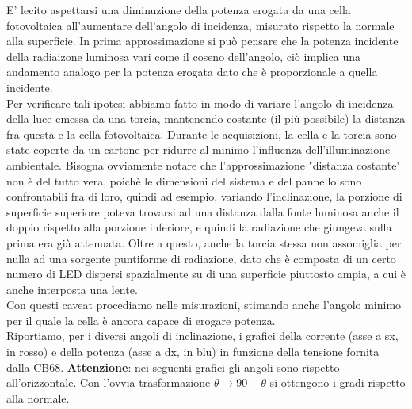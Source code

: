 \documentclass[journal, a4paper]{IEEEtran}
\begin{document}
E' lecito aspettarsi una diminuzione della potenza erogata da una cella fotovoltaica all'aumentare dell'angolo di incidenza, misurato rispetto la normale alla superficie. In prima approssimazione si può pensare che la potenza incidente della radiaizone luminosa vari come il coseno dell'angolo, ciò implica una andamento analogo per la potenza erogata dato che è proporzionale a quella incidente.\\
Per verificare tali ipotesi abbiamo fatto in modo di variare l'angolo di incidenza della luce emessa da una torcia, mantenendo costante (il più possibile) la distanza fra questa e la cella fotovoltaica. Durante le acquisizioni, la cella e la torcia sono state coperte da un cartone per ridurre al minimo l'influenza dell'illuminazione ambientale. Bisogna ovviamente notare che l'approssimazione "distanza costante" non è del tutto vera, poichè le dimensioni del sistema e del pannello sono confrontabili fra di loro, quindi ad esempio, variando l'inclinazione, la porzione di superficie superiore poteva trovarsi ad una distanza dalla fonte luminosa anche il doppio rispetto alla porzione inferiore, e quindi la radiazione che giungeva sulla prima era già attenuata. Oltre a questo, anche la torcia stessa non assomiglia per nulla ad una sorgente puntiforme di radiazione, dato che è composta di un certo numero di LED dispersi spazialmente su di una superficie piuttosto ampia, a cui è anche interposta una lente.\\
Con questi caveat procediamo nelle misurazioni, stimando anche l'angolo minimo per il quale la cella è ancora capace di erogare potenza.\\

Riportiamo, per i diversi angoli di inclinazione, i grafici della corrente (asse a sx, in rosso) e della potenza (asse a dx, in blu) in funzione della tensione fornita dalla CB68.
\textbf{Attenzione}: nei seguenti grafici gli angoli sono rispetto all'orizzontale. Con l'ovvia trasformazione $\theta \rightarrow 90 - \theta$ si ottengono i gradi rispetto alla normale.
\end{document}

